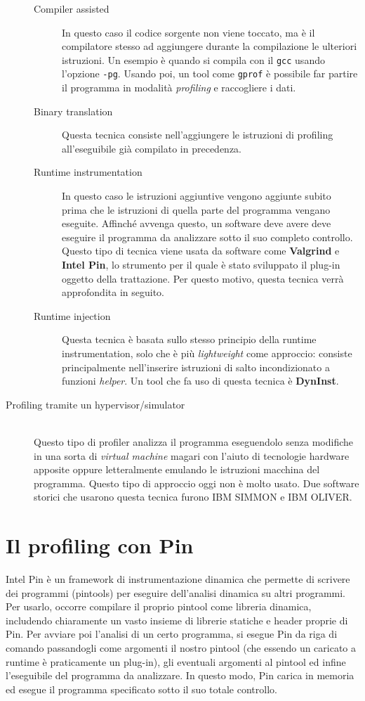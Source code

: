 \documentclass[a4paper,11pt]{report}
\begin{document}
\begin{description}
\begin{description}
\item[Compiler assisted]
In questo caso il codice sorgente non viene toccato, ma è il compilatore stesso ad aggiungere durante la compilazione le ulteriori istruzioni. Un esempio è quando si compila con il \verb|gcc| usando l'opzione \verb|-pg|. Usando poi, un tool come \verb|gprof| è possibile far partire il programma in modalità \textit{profiling} e raccogliere i dati.
\item[Binary translation]
Questa tecnica consiste nell'aggiungere le istruzioni di profiling all'eseguibile già compilato in precedenza.
\item[Runtime instrumentation]
In questo caso le istruzioni aggiuntive vengono aggiunte subito prima che le istruzioni di quella parte del programma vengano eseguite. Affinché avvenga questo, un software deve avere deve eseguire il programma da analizzare sotto il suo completo controllo. Questo tipo di tecnica viene usata da software come \textbf{Valgrind} e \textbf{Intel Pin}, lo strumento per il quale è stato sviluppato il plug-in oggetto della trattazione. Per questo motivo, questa tecnica verrà approfondita in seguito.
\item[Runtime injection]
Questa tecnica è basata sullo stesso principio della runtime instrumentation, solo che è più \textit{lightweight} come approccio: consiste principalmente nell'inserire istruzioni di salto incondizionato a funzioni \textit{helper}. Un tool che fa uso di questa tecnica è \textbf{DynInst}.
\end{description} 
\item[Profiling tramite un hypervisor/simulator] \hfill \\
Questo tipo di profiler analizza il programma eseguendolo senza modifiche in una sorta di \textit{virtual machine} magari con l'aiuto di tecnologie hardware apposite oppure letteralmente emulando le istruzioni macchina del programma. Questo tipo di approccio oggi non è molto usato. Due software storici che usarono questa tecnica furono IBM SIMMON e IBM OLIVER. 
\end{description}

\section{Il profiling con Pin}
Intel Pin è un framework di instrumentazione dinamica che permette di scrivere dei programmi (pintools) per eseguire dell'analisi dinamica su altri programmi. Per usarlo, occorre compilare il proprio pintool come libreria dinamica, includendo chiaramente un vasto insieme di librerie statiche e header proprie di Pin. Per avviare poi l'analisi di un certo programma, si esegue Pin da riga di comando passandogli come argomenti il nostro pintool (che essendo un caricato a runtime è praticamente un plug-in), gli eventuali argomenti al pintool ed infine l'eseguibile del programma da analizzare. In questo modo, Pin carica in memoria ed esegue il programma specificato sotto il suo totale controllo. 
\end{document}
